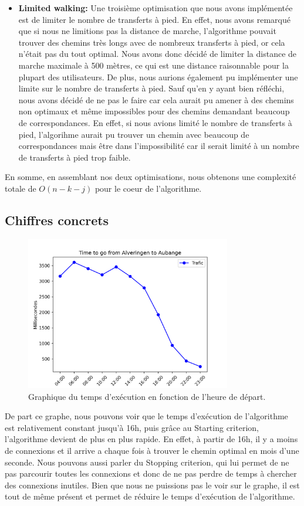 \documentclass[12pt]{article}
\begin{document}
\begin{itemize}
    \item \textbf{Limited walking:} Une troisième optimisation que nous avons implémentée est de limiter le nombre de transferts à pied. En effet, nous avons remarqué que si
    nous ne limitions pas la distance de marche, l'algorithme pouvait trouver des chemins très longs avec de nombreux transferts à pied, or cela n'était pas du tout optimal.
    Nous avons donc décidé de limiter la distance de marche maximale à 500 mètres, ce qui est une distance raisonnable pour la plupart des utilisateurs.
    De plus, nous aurions également pu implémenter une limite sur le nombre de transferts à pied. Sauf qu'en y ayant bien réfléchi, nous avons décidé de ne pas le faire car cela aurait
    pu amener à des chemins non optimaux et même impossibles pour des chemins demandant beaucoup de correspondances. En effet, si nous avions limité le nombre de transferts à pied,
    l'algorihme aurait pu trouver un chemin avec beaucoup de correspondances mais être dans l'impossibilité car il serait limité à un nombre de transferts à pied trop faible.
\end{itemize}

En somme, en assemblant nos deux optimisations, nous obtenons une complexité totale de $O(n - k - j)$ pour le coeur de l'algorithme.

\subsection{Chiffres concrets}
\begin{figure}[H]
  \centering
  \includegraphics[width=0.8\textwidth]{graphique_traffique}
  \caption{Graphique du temps d'exécution en fonction de l'heure de départ.}
  \label{fig:graphique_traffique}
\end{figure}
De part ce graphe, nous pouvons voir que le temps d'exécution de l'algorithme est relativement constant jusqu'à 16h, puis grâce au Starting criterion,
l'algorithme devient de plus en plus rapide. En effet, à partir de 16h, il y a moins de connexions et il arrive a chaque fois à trouver le chemin optimal en mois d'une seconde.
Nous pouvons aussi parler du Stopping criterion, qui lui permet de ne pas parcourir toutes les connexions et donc de ne pas perdre de temps à chercher des connexions inutiles.
Bien que nous ne puissions pas le voir sur le graphe, il est tout de même présent et permet de réduire le temps d'exécution de l'algorithme.
\end{document}
